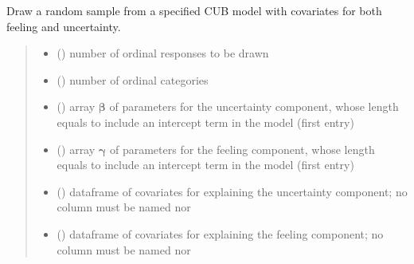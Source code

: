 \documentclass[letterpaper,10pt,english]{sphinxmanual}
\begin{document}
\begin{fulllineitems}
\label{\detokenize{cubmods:cubmods.cub_yw.draw}}
\pysigstartsignatures
{}
\pysigstopsignatures
\sphinxAtStartPar
Draw a random sample from a specified CUB model with covariates for
both feeling and uncertainty.
\begin{quote}\begin{description}
\begin{itemize}
\item {} 
\sphinxAtStartPar
{} () \textendash{} number of ordinal responses to be drawn

\item {} 
\sphinxAtStartPar
{} () \textendash{} number of ordinal categories

\item {} 
\sphinxAtStartPar
{} () \textendash{} array \(\pmb \beta\) of parameters for the uncertainty component, whose length equals 
 to include an intercept term in the model (first entry)

\item {} 
\sphinxAtStartPar
{} () \textendash{} array \(\pmb \gamma\) of parameters for the feeling component, whose length equals 
 to include an intercept term in the model (first entry)

\item {} 
\sphinxAtStartPar
{} () \textendash{} dataframe of covariates for explaining the uncertainty component;
no column must be named  nor 

\item {} 
\sphinxAtStartPar
{} () \textendash{} dataframe of covariates for explaining the feeling component;
no column must be named  nor 


\end{itemize}
\end{description}
\end{quote}
\end{fulllineitems}
\end{document}
